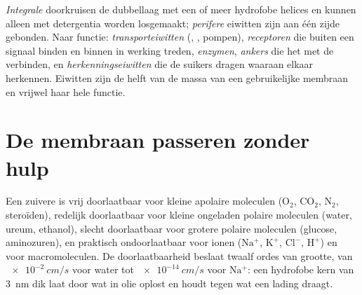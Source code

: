 \begin{definition}[Membraaneiwitten]\label{def:b1:membranes-transport:proteins}
\emph{Integrale}  doorkruisen de
dubbellaag met een of meer hydrofobe helices en kunnen alleen met detergentia
worden losgemaakt; \emph{perifere} eiwitten zijn aan één zijde gebonden. Naar
functie: \emph{transporteiwitten} (, , pompen),
\emph{receptoren} die buiten een signaal binden en binnen in werking treden,
\emph{enzymen}, \emph{ankers} die het  met de 
verbinden, en \emph{herkenningseiwitten} die de suikers dragen waaraan 
elkaar herkennen. Eiwitten zijn de helft van de massa van een gebruikelijke
membraan en vrijwel haar hele functie.
\end{definition}

\section{De membraan passeren zonder hulp}

\begin{proposition}\label{prop:b1:membranes-transport:permeability}
Een zuivere  is vrij doorlaatbaar voor kleine apolaire moleculen
($\mathrm{O_2}$, $\mathrm{CO_2}$, $\mathrm{N_2}$, steroïden), redelijk
doorlaatbaar voor kleine ongeladen polaire moleculen (water, ureum, ethanol),
slecht doorlaatbaar voor grotere polaire moleculen (glucose, aminozuren), en
praktisch ondoorlaatbaar voor ionen ($\mathrm{Na^+}$, $\mathrm{K^+}$,
$\mathrm{Cl^-}$, $\mathrm{H^+}$) en voor macromoleculen. De doorlaatbaarheid
beslaat twaalf ordes van grootte, van $\qty{e-2}{cm/s}$ voor water tot
$\qty{e-14}{cm/s}$ voor $\mathrm{Na^+}$: een hydrofobe kern van \qty{3}{nm} dik
laat door wat in olie oplost en houdt tegen wat een lading draagt.
\end{proposition}

